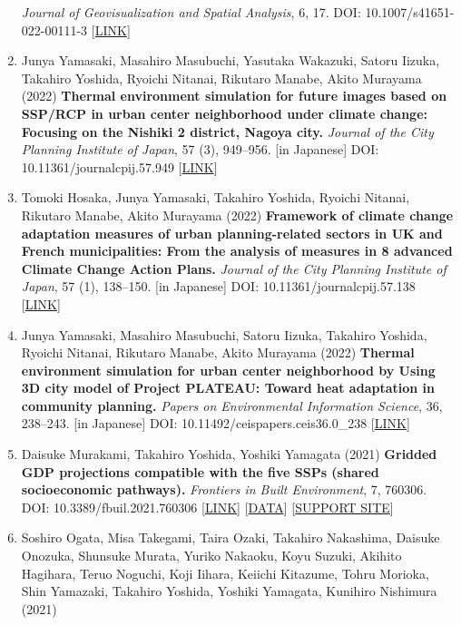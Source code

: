 \documentclass[
]{book}
\begin{document}
\begin{enumerate}
  \emph{Journal of Geovisualization and Spatial Analysis}, 6, 17.
  DOI: 10.1007/s41651-022-00111-3 {[}\href{https://link.springer.com/article/10.1007/s41651-022-00111-3}{LINK}{]}
\item
  Junya Yamasaki, Masahiro Masubuchi, Yasutaka Wakazuki, Satoru Iizuka, Takahiro Yoshida, Ryoichi Nitanai, Rikutaro Manabe, Akito Murayama (2022)
  \textbf{Thermal environment simulation for future images based on SSP/RCP in urban center neighborhood under climate change: Focusing on the Nishiki 2 district, Nagoya city.}
  \emph{Journal of the City Planning Institute of Japan}, 57 (3), 949--956. {[}in Japanese{]}
  DOI: 10.11361/journalcpij.57.949 {[}\href{https://doi.org/10.11361/journalcpij.57.949}{LINK}{]}
\item
  Tomoki Hosaka, Junya Yamasaki, Takahiro Yoshida, Ryoichi Nitanai, Rikutaro Manabe, Akito Murayama (2022)
  \textbf{Framework of climate change adaptation measures of urban planning-related sectors in UK and French municipalities: From the analysis of measures in 8 advanced Climate Change Action Plans.}
  \emph{Journal of the City Planning Institute of Japan}, 57 (1), 138--150. {[}in Japanese{]}
  DOI: 10.11361/journalcpij.57.138 {[}\href{https://doi.org/10.11361/journalcpij.57.138}{LINK}{]}
\item
  Junya Yamasaki, Masahiro Masubuchi, Satoru Iizuka, Takahiro Yoshida, Ryoichi Nitanai, Rikutaro Manabe, Akito Murayama (2022)
  \textbf{Thermal environment simulation for urban center neighborhood by Using 3D city model of Project PLATEAU: Toward heat adaptation in community planning.}
  \emph{Papers on Environmental Information Science}, 36, 238--243. {[}in Japanese{]}
  DOI: 10.11492/ceispapers.ceis36.0\_238 {[}\href{https://doi.org/10.11492/ceispapers.ceis36.0_238}{LINK}{]}
\item
  Daisuke Murakami, Takahiro Yoshida, Yoshiki Yamagata (2021)
  \textbf{Gridded GDP projections compatible with the five SSPs (shared socioeconomic pathways).}
  \emph{Frontiers in Built Environment}, 7, 760306.
  DOI: 10.3389/fbuil.2021.760306 {[}\href{https://www.frontiersin.org/articles/10.3389/fbuil.2021.760306/abstract}{LINK}{]} {[}\href{https://figshare.com/articles/dataset/Gridded_GDP_projections_compatible_with_the_five_SSPs_Shared_Socioeconomic_Pathways_/12016506/1}{DATA}{]}
  {[}\href{https://gcp-tsukuba.github.io/SSP-downscale/}{SUPPORT SITE}{]}
\item
  Soshiro Ogata, Misa Takegami, Taira Ozaki, Takahiro Nakashima, Daisuke Onozuka, Shunsuke Murata, Yuriko Nakaoku, Koyu Suzuki, Akihito Hagihara, Teruo Noguchi, Koji Iihara, Keiichi Kitazume, Tohru Morioka, Shin Yamazaki, Takahiro Yoshida, Yoshiki Yamagata, Kunihiro Nishimura (2021)

\end{enumerate}
\end{document}
